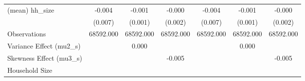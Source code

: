 \begin{table}[htbp]
\begin{tabular}{l*{6}{c}}
(mean) hh\_size  &   -0.004         &   -0.001         &   -0.000         &   -0.004         &   -0.001         &   -0.000         \\
                &  (0.007)         &  (0.001)         &  (0.002)         &  (0.007)         &  (0.001)         &  (0.002)         \\
\midrule
Observations    &68592.000         &68592.000         &68592.000         &68592.000         &68592.000         &68592.000         \\
Variance Effect (mu2\_s)&                  &    0.000         &                  &                  &    0.000         &                  \\
Skewness Effect (mu3\_s)&                  &                  &   -0.005         &                  &                  &   -0.005         \\
Household Size  &                  &                  &                  &                  &                  &                  \\
\bottomrule
\end{tabular}
\end{table}
